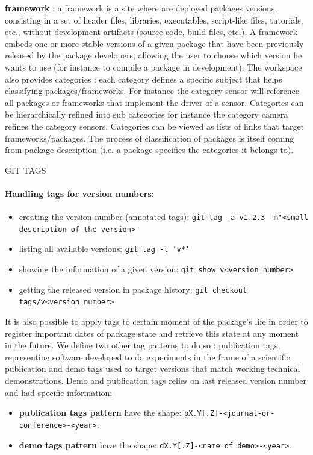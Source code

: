 \documentclass[12pt,a4paper]{article}
\begin{document}
\textbf{framework} :  a framework is a site where are deployed packages versions, consisting in a set of header files, libraries, executables, script-like files, tutorials, etc., without development artifacts (source code, build files, etc.). A framework embeds one or more stable versions of a given package that have been previously released by the package developers, allowing the user to choose which version he wants to use (for instance to compile a package in development).
 The workspace also provides categories : each category defines a specific subject that helps classifying packages/frameworks. For instance the category sensor will reference all packages or frameworks that implement the driver of a sensor. Categories can be hierarchically refined into sub categories for instance the category camera refines the category sensors. Categories can be viewed as lists of links that target frameworks/packages. The process of classification of packages is itself coming from package description (i.e. a package specifies the categories it belongs to).
 
 
GIT TAGS
 
\paragraph{Handling tags for version numbers:}
\begin{itemize}
\item creating the version number (annotated tags):
\linebreak \texttt{git tag -a v1.2.3 -m"<small description of the version>"}
\item listing all available versions: 
\linebreak \texttt{git tag -l 'v*'}
\item showing the information of a given version: 
\linebreak \texttt{git show v<version number>}
\item getting the released version in package history: 
\linebreak \texttt{git checkout tags/v<version number>}
\end{itemize}


It is also possible to apply tags to certain moment of the package's life in order to register important dates of package state and retrieve this state at any moment in the future. We define two other tag patterns to do so : publication tags, representing software developed to do experiments in the frame of a scientific publication and demo tags used to target versions that match working technical demonstrations. Demo and publication tags relies on last released version number and had specific information:
\begin{itemize}
\item \textbf{publication tags pattern} have the shape: \linebreak \texttt{pX.Y[.Z]-<journal-or-conference>-<year>}.
\item \textbf{demo tags pattern} have the shape:
\linebreak \texttt{dX.Y[.Z]-<name of demo>-<year>}.
\end{itemize}
 
\end{document}
